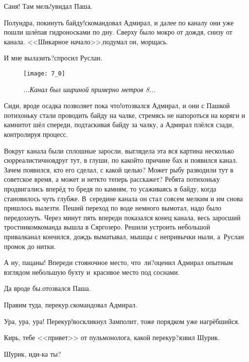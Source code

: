 \diagdash Саня! Там мель!\mdash увидал Паша. 

\diagdash Полундра, покинуть байду!\mdash скомандовал Адмирал, и далее по каналу они уже пошли шлёпая гидроносками по дну. Сверху было мокро от дождя, снизу от канала. <<Шикарное начало>>,\mdash подумал он, морщась.

\diagdash И мне вылазить?\mdash спросил Руслан. 

\begin{figure}[h]
	\centering
	\texttt{[image: 7\_0]}
	\caption{\small\textit{...Канал был шириной примерно метров 8...}}
\end{figure}

\diagdash Сиди, вроде осадка позволяет пока что!\mdash отозвался Адмирал, и они с Пашкой потихоньку стали проводить байду на чалке, стремясь не напороться на коряги и камни\mdash тот шёл спереди, подтаскивая байду за чалку, а Адмирал плёлся сзади, контролируя процесс.

Вокруг канала были сплошные заросли, выглядела эта вся картина несколько сюрреалистично\mdash вдруг тут, в глуши, по какой\sdash то причине бах и появился канал. Зачем появился, кто его сделал, с какой целью? Может рыбу разводили тут в советское время, а может и нет\mdash кто теперь расскажет? Ребята потихоньку продвигались вперёд то бредя по камням, то усаживаясь в байду, когда становилось чуть глубже. В~середине канала он стал совсем мелким и им снова пришлось вылезти. Пеший переход по воде немного вымотал, надо было передохнуть. Через минут пять впереди показался конец канала, весь заросший тростником\mdash команда вышла в Сяргозеро. Решили устроить небольшой привал\mdash канал кончился, дождь выматывал, мышцы с непривычки ныли, а~Руслан промок до нитки.

\diagdash А ну, пацаны! Впереди стояночное место, что~ли?\mdash оценил Адмирал опытным взглядом небольшую бухту и~красивое место под соснами.

\diagdash Да вроде бы.\mdash отозвался Паша.

\diagdash Правим туда, перекур.\mdash скомандовал Адмирал. 

\diagdash Ура, ура, ура! Перекур!\mdash воскликнул Замполит, тоже порядком уже нагрёбшийся.

\diagdash Кирь, тебе <<привет>> от пульмонолога, какой перекур?\mdash язвил Шурик.

\diagdash Шурик, иди-ка ты?

